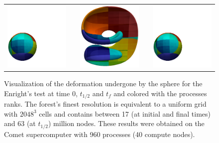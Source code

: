 \begin{figure}[htbp]
\begin{center}
\begin{tabular}{ccccc}
\includegraphics[width=.28\textwidth]{figures/enright_0.png}
&
\hspace{.1cm}
&
\includegraphics[width=.28\textwidth]{figures/enright_1.png}
&
\hspace{.1cm}
&
\includegraphics[width=.28\textwidth]{figures/enright_2.png}
\end{tabular}
\caption{Visualization of the deformation undergone by the sphere for the Enright's test at time 0, $t_{1/2}$ and $t_f$ and colored with the processes ranks. The forest's finest resolution is equivalent to a uniform grid with $2048^3$ cells and contains between 17 (at initial and final times) and 63 (at $t_{1/2}$) million nodes. These results were obtained on the Comet supercomputer with 960 processes (40 compute nodes).} \label{fig:accuracy}
\end{center}
\end{figure}